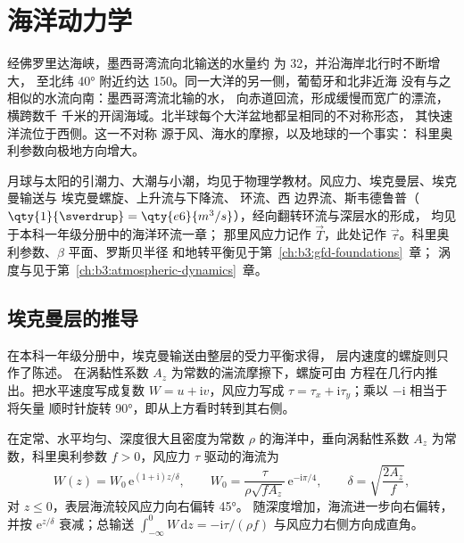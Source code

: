 \chapter{海洋动力学}\label{ch:b3:ocean-dynamics}

经佛罗里达海峡，墨西哥湾流向北输送的水量约
为 \qty{32}{\sverdrup}，并沿海岸北行时不断增大，
至北纬 \ang{40} 附近约达 \qty{150}{\sverdrup}。同一大洋的另一侧，葡萄牙和北非近海
没有与之相似的水流向南：墨西哥湾流北输的水，
向赤道回流，形成缓慢而宽广的漂流，横跨数千
千米的开阔海域。北半球每个大洋盆地都呈相同的不对称形态，
其快速洋流位于西侧。这一不对称
源于风、海水的摩擦，以及地球的一个事实：
科里奥利参数向极地方向增大。

\begin{recall}
月球与太阳的引潮力、大潮与小潮，均见于物理学教材。风应力、埃克曼层、埃克曼输送与
埃克曼螺旋、上升流与下降流、
环流、西
边界流、斯韦德鲁普（$\qty{1}{\sverdrup} =
\qty{e6}{m^3/s}$），经向翻转环流与深层水的形成，
均见于本科一年级分册中的海洋环流一章；
那里风应力记作 $\vec T$，此处记作
$\vec\tau$。科里奥利参数、$\beta$ 平面、罗斯贝半径
和地转平衡见于第~\ref{ch:b3:gfd-foundations}~章；
涡度与见于第~\ref{ch:b3:atmospheric-dynamics}~章。
\end{recall}

\section{埃克曼层的推导}\label{sec:b3:ocean-dynamics:ekman}

在本科一年级分册中，埃克曼输送由整层的受力平衡求得，
层内速度的螺旋则只作了陈述。
在涡黏性系数 $A_z$ 为常数的湍流摩擦下，螺旋可由
方程在几行内推出。把水平速度写成复数
$W = u + \mathrm iv$，风应力写成 $\tau =
\tau_x + \mathrm i\tau_y$；乘以 $-\mathrm i$ 相当于将矢量
顺时针旋转 \ang{90}，即从上方看时转到其右侧。

\begin{theorem}[稳定风驱动表层的速度剖面]\label{thm:b3:ocean-dynamics:ekman}
在定常、水平均匀、深度很大且密度为常数
$\rho$ 的海洋中，垂向涡黏性系数 $A_z$ 为常数，科里奥利参数
$f > 0$，风应力 $\tau$ 驱动的海流为
\[
W(z) = W_0\,\mathrm e^{(1+\mathrm i)z/\delta},\qquad
W_0 = \frac{\tau}{\rho\sqrt{fA_z}}\,\mathrm e^{-\mathrm i\pi/4},\qquad
\delta = \sqrt{\frac{2A_z}{f}} ,
\]
对 $z \le 0$，表层海流较风应力向右偏转 \ang{45}。
随深度增加，海流进一步向右偏转，并按 $\mathrm
e^{z/\delta}$ 衰减；总输送 $\int_{-\infty}^0 W\,\mathrm dz =
-\mathrm i\tau/(\rho f)$ 与风应力右侧方向成直角。
\end{theorem}

